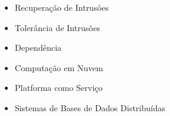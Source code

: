 \begin{resumo}

\end{resumo}
\vspace{-2cm}
\begin{palavraschave}
\vspace{-1cm}
\begin{itemize}
\item Recuperação de Intrusões
\item Tolerância de Intrusões
\item Dependência
\item Computação em Nuvem
\item Platforma como Serviço
\item Sistemas de Bases de Dados Distribuídas
\end{itemize}
\end{palavraschave}
\clearpage
\thispagestyle{empty}
\cleardoublepage
